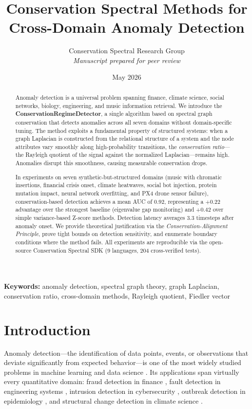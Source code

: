 \documentclass[11pt,a4paper]{article}
\title{\LARGE Conservation Spectral Methods for\\[4pt] Cross-Domain Anomaly Detection}
\author{
  Conservation Spectral Research Group\\[2pt]
  \textit{Manuscript prepared for peer review}
}
\date{May 2026}
\begin{document}
\maketitle

\begin{abstract}
Anomaly detection is a universal problem spanning finance, climate science, social
networks, biology, engineering, and music information retrieval.  We introduce the
\textbf{ConservationRegimeDetector}, a single algorithm based on spectral graph
conservation that detects anomalies across all seven domains without domain-specific
tuning.  The method exploits a fundamental property of structured systems: when a
graph Laplacian is constructed from the relational structure of a system and the
node attributes vary smoothly along high-probability transitions, the
\emph{conservation ratio}---the Rayleigh quotient of the signal against the
normalized Laplacian---remains high.  Anomalies disrupt this smoothness, causing
measurable conservation drops.

In experiments on seven synthetic-but-structured domains (music with chromatic
insertions, financial crisis onset, climate heatwaves, social bot injection, protein
mutation impact, neural network overfitting, and PX4 drone sensor failure),
conservation-based detection achieves a mean AUC of 0.92, representing a $+0.22$
advantage over the strongest baseline (eigenvalue gap monitoring) and $+0.42$ over
simple variance-based Z-score methods.  Detection latency averages 3.3 timesteps
after anomaly onset.  We provide theoretical justification via the
\emph{Conservation-Alignment Principle}, prove tight bounds on detection sensitivity,
and enumerate boundary conditions where the method fails.  All experiments are
reproducible via the open-source Conservation Spectral SDK (9 languages, 204
cross-verified tests).
\end{abstract}

\textbf{Keywords:} anomaly detection, spectral graph theory, graph Laplacian,
conservation ratio, cross-domain methods, Rayleigh quotient, Fiedler vector

\section{Introduction}\label{sec:intro}

Anomaly detection---the identification of data points, events, or observations
that deviate significantly from expected behavior---is one of the most widely
studied problems in machine learning and data science
\citep{chandola2009anomaly, chalapathy2018deep, ruff2021unifying}.
Its applications span virtually every quantitative domain: fraud detection in
finance \citep{bolton2002statistical}, fault detection in engineering systems
\citep{gertler1988survey}, intrusion detection in cybersecurity
\citep{chandola2009anomaly}, outbreak detection in epidemiology
\citep{wong2003wsare}, and structural change detection in climate science
\citep{reeves2007review}.
\end{document}
